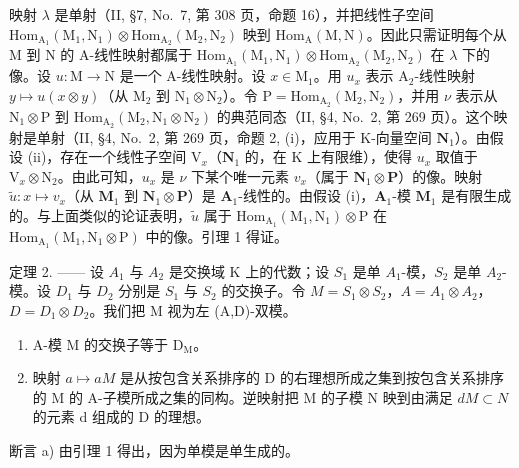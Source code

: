映射 \(\lambda\) 是单射（II, §7, No.~7, 第 308 页，命题 16），并把线性子空间 \(\mathrm{Hom}_{\mathrm{A}_1}(\mathrm{M}_1,\mathrm{N}_1)\otimes \mathrm{Hom}_{\mathrm{A}_2}(\mathrm{M}_2,\mathrm{N}_2)\) 映到 \(\mathrm{Hom}_{\mathrm{A}}(\mathrm{M},\mathrm{N})\)。因此只需证明每个从 M 到 N 的 A-线性映射都属于 \(\mathrm{Hom}_{\mathrm{A}_1}(\mathrm{M}_1,\mathrm{N}_1)\otimes \mathrm{Hom}_{\mathrm{A}_2}(\mathrm{M}_2,\mathrm{N}_2)\) 在 \(\lambda\) 下的像。设 \(u:\mathrm{M}\to \mathrm{N}\) 是一个 A-线性映射。设 \(x\in \mathrm{M}_1\)。用 \(u_{x}\) 表示 \(\mathrm{A}_2\)-线性映射 \(y\mapsto u(x\otimes y)\)（从 \(\mathrm{M}_2\) 到 \(\mathrm{N}_1\otimes \mathrm{N}_2\)）。令 \(\mathrm{P} = \mathrm{Hom}_{\mathrm{A}_2}(\mathrm{M}_2,\mathrm{N}_2)\)，并用 \(\nu\) 表示从 \(\mathrm{N}_1\otimes \mathrm{P}\) 到 \(\mathrm{Hom}_{\mathrm{A}_2}(\mathrm{M}_2,\mathrm{N}_1\otimes \mathrm{N}_2)\) 的典范同态（II, §4, No.~2, 第 269 页）。这个映射是单射（II, §4, No.~2, 第 269 页，命题 2, (i)，应用于 K-向量空间 \(\mathbf{N}_1\)）。由假设 (ii)，存在一个线性子空间 \(\mathrm{V}_x\)（\(\mathbf{N}_1\) 的，在 K 上有限维），使得 \(u_{x}\) 取值于 \(\mathrm{V}_x\otimes \mathrm{N}_2\)。由此可知，\(u_{x}\) 是 \(\nu\) 下某个唯一元素 \(v_{x}\)（属于 \(\mathbf{N}_1\otimes \mathbf{P}\)）的像。映射 \(\widetilde{u}:x\mapsto v_x\)（从 \(\mathbf{M}_1\) 到 \(\mathbf{N}_1\otimes \mathbf{P}\)）是 \(\mathbf{A}_1\)-线性的。由假设 (i)，\(\mathbf{A}_1\)-模 \(\mathbf{M}_1\) 是有限生成的。与上面类似的论证表明，\(\widetilde{u}\) 属于 \(\mathrm{Hom}_{\mathrm{A}_1}(\mathrm{M}_1,\mathrm{N}_1)\otimes \mathrm{P}\) 在 \(\mathrm{Hom}_{\mathrm{A}_1}(\mathrm{M}_1,\mathrm{N}_1\otimes \mathrm{P})\) 中的像。引理 1 得证。

定理 2. —— 设 \(A_{1}\) 与 \(A_{2}\) 是交换域 K 上的代数；设 \(S_{1}\) 是单 \(A_{1}\)-模，\(S_{2}\) 是单 \(A_{2}\)-模。设 \(D_{1}\) 与 \(D_{2}\) 分别是 \(S_{1}\) 与 \(S_{2}\) 的交换子。令 \(M = S_{1} \otimes S_{2}\)，\(A = A_{1} \otimes A_{2}\)，\(D = D_{1} \otimes D_{2}\)。我们把 M 视为左 (A,D)-双模。

\begin{enumerate}
\def\labelenumi{\alph{enumi})}
\item
  A-模 M 的交换子等于 \(\mathrm{D}_{\mathrm{M}}\)。
\item
  映射 \(a \mapsto aM\) 是从按包含关系排序的 D 的右理想所成之集到按包含关系排序的 M 的 A-子模所成之集的同构。逆映射把 M 的子模 N 映到由满足 \(dM \subset N\) 的元素 d 组成的 D 的理想。
\end{enumerate}

断言 a) 由引理 1 得出，因为单模是单生成的。

